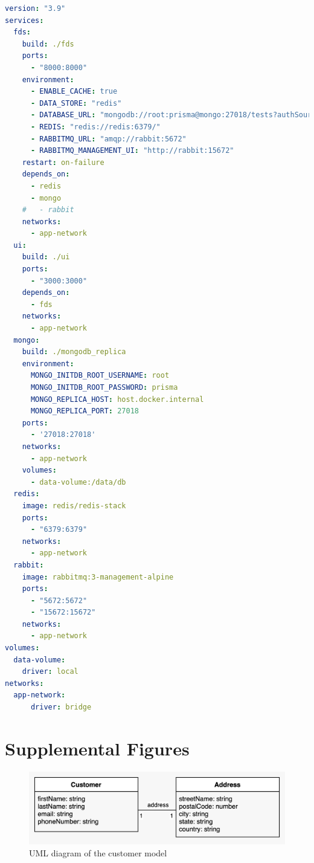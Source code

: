   \begin{lstlisting}[caption={Docker Compose usage (YAML)}, label={code:compose}, language=yaml]
version: "3.9"
services:
  fds:
    build: ./fds
    ports:
      - "8000:8000"
    environment:
      - ENABLE_CACHE: true
      - DATA_STORE: "redis"
      - DATABASE_URL: "mongodb://root:prisma@mongo:27018/tests?authSource=admin/"
      - REDIS: "redis://redis:6379/"
      - RABBITMQ_URL: "amqp://rabbit:5672"
      - RABBITMQ_MANAGEMENT_UI: "http://rabbit:15672"
    restart: on-failure
    depends_on:
      - redis
      - mongo
    #   - rabbit
    networks:
      - app-network
  ui:
    build: ./ui
    ports: 
      - "3000:3000"
    depends_on: 
      - fds
    networks:
      - app-network  
  mongo:
    build: ./mongodb_replica
    environment:
      MONGO_INITDB_ROOT_USERNAME: root
      MONGO_INITDB_ROOT_PASSWORD: prisma
      MONGO_REPLICA_HOST: host.docker.internal
      MONGO_REPLICA_PORT: 27018
    ports:
      - '27018:27018'
    networks:
      - app-network
    volumes:
      - data-volume:/data/db
  redis:
    image: redis/redis-stack
    ports:
      - "6379:6379"
    networks: 
      - app-network
  rabbit:
    image: rabbitmq:3-management-alpine
    ports:
      - "5672:5672"
      - "15672:15672"
    networks:
      - app-network
volumes:
  data-volume:
    driver: local
networks:
  app-network:
      driver: bridge
  \end{lstlisting}

  \newpage
  \section{Supplemental Figures}

  \begin{figure}[!ht]
   \includegraphics[width=\textwidth]{diagrams/entity_customer.jpeg}
   \caption{UML diagram of the customer model}
   \label{fig:customer_uml}
  \end{figure}
  
